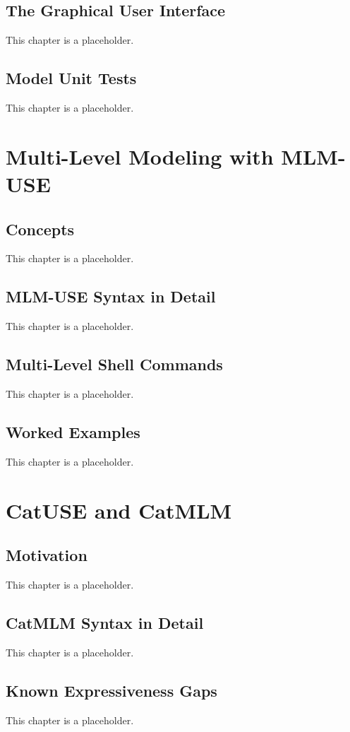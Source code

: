 \documentclass[11pt,twoside,a4paper]{book}
\begin{document}
\chapter{The Graphical User Interface}
\label{sec:org549683a}
This chapter is a placeholder.
\chapter{Model Unit Tests}
\label{sec:org82d72ae}
This chapter is a placeholder.
\part{Multi-Level Modeling with MLM-USE}
\label{sec:orga1bec65}
\chapter{Concepts}
\label{sec:orga4c021d}
This chapter is a placeholder.
\chapter{MLM-USE Syntax in Detail}
\label{sec:org56cf687}
This chapter is a placeholder.
\chapter{Multi-Level Shell Commands}
\label{sec:org8c526d9}
This chapter is a placeholder.
\chapter{Worked Examples}
\label{sec:org0a95039}
This chapter is a placeholder.
\part{CatUSE and CatMLM}
\label{sec:orge58ddb4}
\chapter{Motivation}
\label{sec:orge6bfe96}
This chapter is a placeholder.
\chapter{CatMLM Syntax in Detail}
\label{sec:org06db68c}
This chapter is a placeholder.
\chapter{Known Expressiveness Gaps}
\label{sec:org63541d4}
This chapter is a placeholder.
\end{document}
